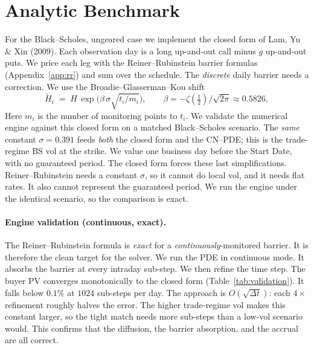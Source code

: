 \documentclass[11pt]{article}
\begin{document}
\section{Analytic Benchmark}\label{sec:analytic}
For the Black--Scholes, ungeared case we implement the closed form of Lam, Yu \& Xin (2009). Each
observation day is a long up-and-out call minus $g$ up-and-out puts. We price each leg with the
Reiner--Rubinstein barrier formulas (Appendix~\ref{app:rr}) and sum over the schedule. The
\emph{discrete} daily barrier needs a correction. We use the Broadie--Glasserman--Kou shift
\begin{equation}
  \tilde H_i \;=\; H\,\exp\!\bigl(\beta\,\sigma\sqrt{t_i/m_i}\bigr),\qquad
  \beta=-\zeta(\tfrac12)/\sqrt{2\pi}\approx 0.5826,
\end{equation}
Here $m_i$ is the number of monitoring points to $t_i$. We validate the numerical engine against
this closed form on a matched Black--Scholes scenario. The \emph{same} constant $\sigma=0.391$ feeds
\emph{both} the closed form and the CN--PDE; this is the trade-regime BS vol at the strike. We value
one business day before the Start Date, with no guaranteed period. The closed form forces these last
simplifications. Reiner--Rubinstein needs a constant $\sigma$, so it cannot do local vol, and it
needs flat rates. It also cannot represent the guaranteed period. We run the engine under the
identical scenario, so the comparison is exact.

\paragraph{Engine validation (continuous, exact).} The Reiner--Rubinstein formula is \emph{exact}
for a \emph{continuously}-monitored barrier. It is therefore the clean target for the solver. We run
the PDE in continuous mode. It absorbs the barrier at every intraday sub-step. We then refine the
time step. The buyer PV converges monotonically to the closed form (Table~\ref{tab:validation}). It
falls below $0.1\%$ at $1024$ sub-steps per day. The approach is $O(\sqrt{\Delta t})$: each $4\times$
refinement roughly halves the error. The higher trade-regime vol makes this constant larger, so the
tight match needs more sub-steps than a low-vol scenario would. This confirms that the diffusion, the
barrier absorption, and the accrual are all correct.
\end{document}
